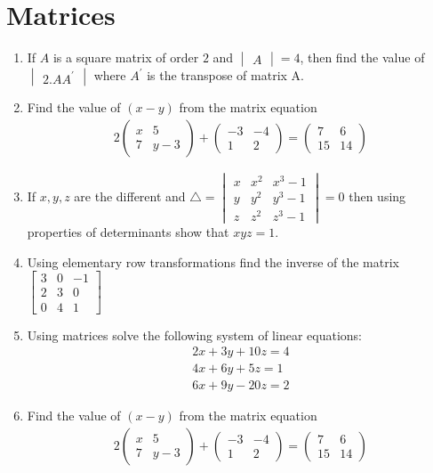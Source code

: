 \documentclass[12pt,-letter paper]{article}
\newcommand{\myvec}[1]{\ensuremath{\begin{pmatrix}#1\end{pmatrix}}}
\newcommand{\mydet}[1]{\ensuremath{\begin{vmatrix}#1\end{vmatrix}}}
\providecommand{\brak}[1]{\ensuremath{\left(#1\right)}}
\begin{document}
\section{Matrices}

\begin{enumerate}

\item If $A$ is a square matrix of order $2$ and $\mydet{A}=4$, then find the value of $\mydet{2.AA^{\prime}}$ where $A^\prime$ is the transpose of matrix A.       
       
\item Find the value of $\brak{x-y}$ from the matrix equation 
	\begin{align*}
		2\myvec{x & 5\\7 & y-3}+\myvec{-3 & -4\\1 & 2}=\myvec{7 & 6\\15 & 14}
	\end{align*}  

\item If $x,y,z$ are the different and $\triangle =
                    \begin{vmatrix}    
		                      x & x^2 & x^3-1\\
				      y & y^2 & y^3-1\\
				      z & z^2 & z^3-1
                    \end{vmatrix}=0$  then using properties of determinants show that $xyz=1$.

\item Using elementary row transformations find the inverse of the matrix
		$\begin{bmatrix}
			3 & 0 &-1\\
			2 & 3 & 0\\
			0 & 4 &1
		\end{bmatrix}$

\item Using matrices solve the following system of linear equations:
	\begin{align*}
		    2x+3y+10z=4\\
	        4x+6y+5z=1\\
	        6x+9y-20z=2
	\end{align*}

\item Find the value of $\brak{x-y}$ from the matrix equation 
	\begin{align*}
		2\myvec{x & 5\\7 & y-3}+\myvec{-3 & -4\\1 & 2}=\myvec{7 & 6\\15 & 14}
	\end{align*}
 
\end{enumerate}
\end{document}
